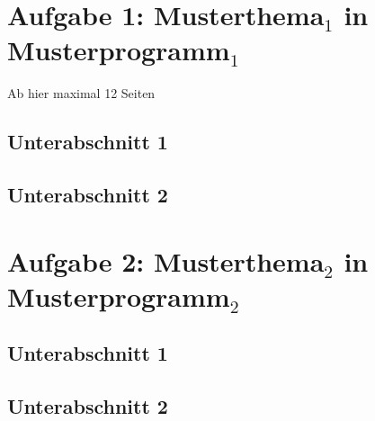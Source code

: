 \section{Aufgabe 1: Musterthema$_1$ in Musterprogramm$_1$}
Ab hier maximal 12 Seiten
\subsection{Unterabschnitt 1}
\vspace{1cm}
\subsection{Unterabschnitt 2}
\pagebreak
\section{Aufgabe 2: Musterthema$_2$ in Musterprogramm$_2$}
\subsection{Unterabschnitt 1}
\vspace{1cm}
\subsection{Unterabschnitt 2}
